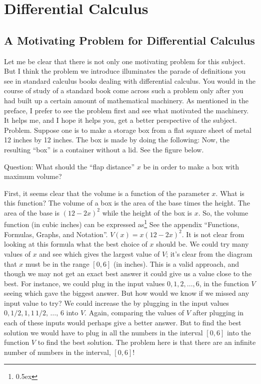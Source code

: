 %
%

\chapter{Differential Calculus}

\section{A Motivating Problem for Differential Calculus}
Let me be clear that there is not only one motivating problem for this 
subject. But I think the problem we introduce illuminates 
the parade of definitions you see in standard calculus books dealing with 
differential calculus. You would in the 
course of study of a standard book come across such a problem only 
after you had built up 
a certain amount of mathematical machinery. As mentioned in the preface,  
I prefer to see the problem 
first and see what motivated the machinery. 
It helps me, and I hope it helps you,
get a better perspective of the subject.
\proclaim Problem.
Suppose one is to make a storage box from a flat 
square sheet of metal 12 inches by 12 inches. The box is made
by doing the following:
\beginEnum
{}
\endEnum
Now, the resulting ``box'' is a container without a lid.
See the figure below. 

Question: What should the ``flap distance'' $x$ be in order to make a
box with maximum volume?

First, it seems clear that the volume is a function of the parameter $x$. 
What is this function? The volume of a box is the area of the base times 
the height. The area of the base is $(12 - 2x)^2$ while the height of the box 
is $x$. So, the volume function (in cubic inches) can be expressed 
as\footnote{\kern 0.5pt \raise 0.5ex \hbox{\dag}}%
{See the appendix ``Functions, Formulas, Graphs, and Notation''.}
$V(x) = x (12 - 2x)^2$. It is not clear from looking 
at this formula what the best choice of $x$ should be. We could try many 
values of $x$ and see which gives the largest value of $V$; 
it's clear from the diagram
that $x$ must be in the range $[0,6]$ (in inches). 
This is a valid approach, and 
though we may not get an exact best answer it could give us a value close 
to the best. For instance,
we could plug in the input values $0,1,2, \ldots, 6$, in the function $V$ 
seeing which gave the biggest answer. But how would we know if we missed any
input value to try? We could increase the  by 
plugging in the input values $0, 1/2, 1, 1 \, 1/2, \, \ldots, \, 6$ into $V$. 
Again, comparing the values of $V$ after plugging in each of these inputs 
would perhaps give a better answer. But to find 
the best solution we would have to plug in all the numbers in the interval 
$[0,6]$ into the function $V$ to find the best solution. The problem here is 
that there are an infinite number of numbers in the interval, $[0,6]$!

